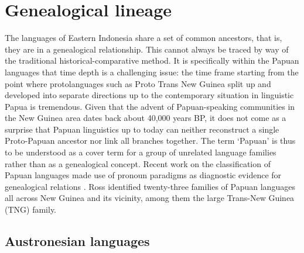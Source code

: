 \section{Genealogical lineage}\label{sec:geneticlineage}

The languages of Eastern Indonesia share a set of common ancestors, that is, they are in a genealogical relationship. This cannot always be traced by way of the traditional historical-comparative method. It is specifically within the Papuan languages that time depth is a challenging issue: the time frame starting from the point where protolanguages such as Proto Trans New Guinea split up and developed into separate directions up to the contemporary situation in linguistic Papua is tremendous. Given that the advent of Papuan-speaking communities in the New Guinea area dates back about 40,000 years BP, it does not come as a surprise that Papuan linguistics up to today can neither reconstruct a single Proto-Papuan ancestor nor link all branches together. The term `Papuan' is thus to be understood as a cover term for a group of unrelated language families rather than as a genealogical concept. Recent work on the classification of Papuan languages made use of pronoun paradigms as diagnostic evidence for genealogical relations \citep{Ross2005}. Ross identified twenty-three families of Papuan languages all across New Guinea and its vicinity, among them the large Trans-New Guinea (TNG) family.

\subsection{Austronesian languages}

